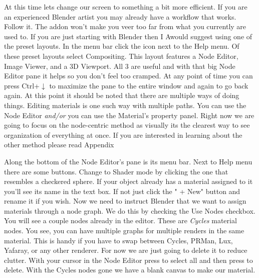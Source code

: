 At this time lets change our screen to something a bit more efficient.  If you are an experienced Blender artist you may already have a workflow that works.  Follow it.  The addon won't make you veer too far from what you currently are used to.  If you are just starting with Blender then I Awould suggest using one of the preset layouts.  In the menu bar click the icon next to the \textsf{Help} menu.  Of these preset layouts select \textsf{Compositing}.  This layout features a \textsf{Node Editor}, \textsf{Image Viewer}, and a \textsf{3D Viewport}.  All 3 are useful and with that big \textsf{Node Editor} pane it helps so you don't feel too cramped.  At any point of time you can press Ctrl+$\downarrow$ to maximize the pane to the entire window and again to go back again.  At this point it should be noted that there are multiple ways of doing things.  Editing materials is one such way with multiple paths.  You can use the \textsf{Node Editor} \emph{and/or} you can use the \textsf{Material}'s property panel.  Right now we are going to focus on the node-centric method as visually its the clearest way to see organization of everything at once.  If you are interested in learning about the other method please read Appendix 

Along the bottom of the \textsf{Node Editor}'s pane is its menu bar.  Next to \textsf{Help} menu there are some buttons.  Change to \textsf{Shader} mode by clicking the one that resembles a checkered sphere.  If your object already has a material assigned to it you'll see its name in the text box.  If not just click the "\textsf{ +    New}" button and rename it if you wish.  Now we need to instruct Blender that we want to assign materials through a node graph.  We do this by checking the \textsf{Use Nodes} checkbox.  You will see a couple nodes already in the editor.  These are \emph{Cycles} material nodes.  You see, you can have multiple graphs for multiple renders in the same material.  This is handy if you have to swap between Cycles, PRMan, Lux, Yafaray, or any other renderer.  For now we are just going to delete it to reduce clutter.  With your cursor in the \textsf{Node Editor} press  to select all and then press  to delete.  With the Cycles nodes gone we have a blank canvas to make our material.

